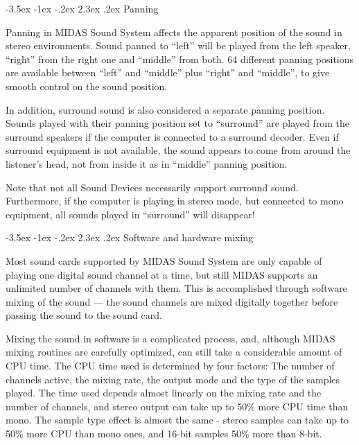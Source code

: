 \documentclass[a4paper,12pt,oneside]{book}
\makeatletter
\renewcommand\section{\@startsection {section}{1}{-20pt}%
                                   {-3.5ex \@plus -1ex \@minus -.2ex}%
                                   {2.3ex \@plus.2ex}%
                                   {\normalfont\Large\bfseries}}
\makeatother
\begin{document}
\section{Panning}

Panning in MIDAS Sound System affects the apparent position of the sound in
stereo environments. Sound panned to ``left'' will be played from the left
speaker, ``right'' from the right one and ``middle'' from both. 64 different
panning positions are available between ``left'' and ``middle'' plus
``right'' and ``middle'', to give smooth control on the sound position.

In addition, surround sound is also considered a separate panning position.
Sounds played with their panning position set to ``surround'' are played from
the surround speakers if the computer is connected to a surround decoder.
Even if surround equipment is not available, the sound appears to come from
around the listener's head, not from inside it as in ``middle'' panning
position.

Note that not all Sound Devices necessarily support surround sound.
Furthermore, if the computer is playing in stereo mode, but connected to mono
equipment, all sounds played in ``surround'' will disappear!


\section{Software and hardware mixing}

Most sound cards supported by MIDAS Sound System are only capable of playing
one digital sound channel at a time, but still MIDAS supports an unlimited
number of channels with them. This is accomplished through software mixing of
the sound --- the sound channels are mixed digitally together before passing
the sound to the sound card.

Mixing the sound in software is a complicated process, and, although MIDAS
mixing routines are carefully optimized, can still take a considerable amount
of CPU time. The CPU time used is determined by four factors: The number of
channels active, the mixing rate, the output mode and the type of the samples
played. The time used depends almost linearly on the mixing rate and the
number of channels, and stereo output can take up to 50\%{} more CPU time
than mono. The sample type effect is almost the same - stereo samples can
take up to 50\%{} more CPU than mono ones, and 16-bit samples 50\%{} more
than 8-bit.
\end{document}
